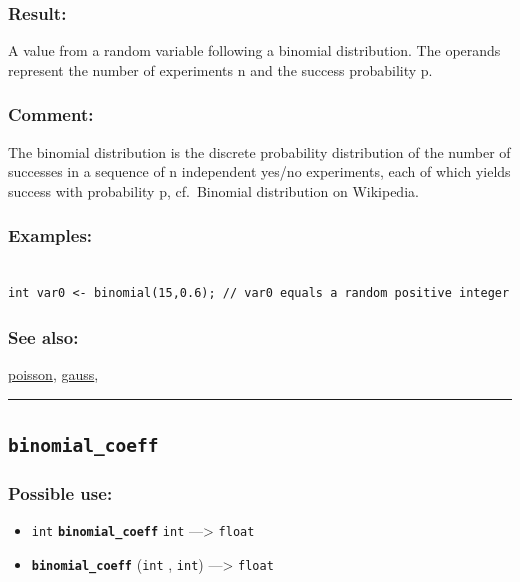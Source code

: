 \documentclass[]{book}
\providecommand{\tightlist}{%
  \setlength{\itemsep}{0pt}\setlength{\parskip}{0pt}}
\theoremstyle{definition}
\theoremstyle{definition}
\theoremstyle{definition}
\theoremstyle{remark}
\begin{document}
\subsubsection{Result:}\label{result-69}

A value from a random variable following a binomial distribution. The
operands represent the number of experiments n and the success
probability p.

\subsubsection{Comment:}\label{comment-15}

The binomial distribution is the discrete probability distribution of
the number of successes in a sequence of n independent yes/no
experiments, each of which yields success with probability p,
cf.~Binomial distribution on Wikipedia.

\subsubsection{Examples:}\label{examples-56}

\begin{verbatim}
 
int var0 <- binomial(15,0.6); // var0 equals a random positive integer
\end{verbatim}

\subsubsection{See also:}\label{see-also-45}

\href{operators-n-to-r.html\#poisson}{poisson},
\href{operators-d-to-h.html\#gauss}{gauss},

\begin{center}\rule{0.5\linewidth}{\linethickness}\end{center}

\subsection{\texorpdfstring{\texttt{binomial\_coeff}}{binomial\_coeff}}\label{binomial_coeff}

\subsubsection{Possible use:}\label{possible-use-71}

\begin{itemize}
\tightlist
\item
  \texttt{int} \textbf{\texttt{binomial\_coeff}} \texttt{int}
  ---\textgreater{} \texttt{float}
\item
  \textbf{\texttt{binomial\_coeff}} (\texttt{int} , \texttt{int})
  ---\textgreater{} \texttt{float}
\end{itemize}
\end{document}
